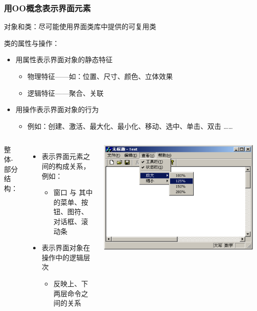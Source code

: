 \documentclass[compress]{beamer}
\begin{document}
\begin{frame}
\frametitle{用OO概念表示界面元素}

 {
对象和类：尽可能使用界面类库中提供的可复用类 \\[2ex]

}

 {
类的属性与操作：
\begin{itemize}
\item 用属性表示界面对象的静态特征
\begin{itemize}
\item 物理特征——如：位置、尺寸、颜色、立体效果 
\item 逻辑特征——聚合、关联
\end{itemize}
\item 用操作表示界面对象的行为
\begin{itemize}
\item 例如：创建、激活、最大化、最小化、移动、选中、单击、双击 ……
\end{itemize}
\end{itemize}
}

 {
\begin{columns}
\column{0.4\hsize}

整体-部分结构：
\noindent\begin{itemize}
  \item 表示界面元素之间的构成关系，例如：
    \begin{itemize}
      \item 窗口 与 其中的菜单、按钮、图符、对话框、滚动条
    \end{itemize}
  \item 表示界面对象在操作中的逻辑层次
    \begin{itemize}
      \item 反映上、下两层命令之间的关系
    \end{itemize}
\end{itemize}

\column{0.6\hsize}
\centering\includegraphics[width=1.0\hsize]{window.png}
\end{columns}
}


\end{frame}
\end{document}
